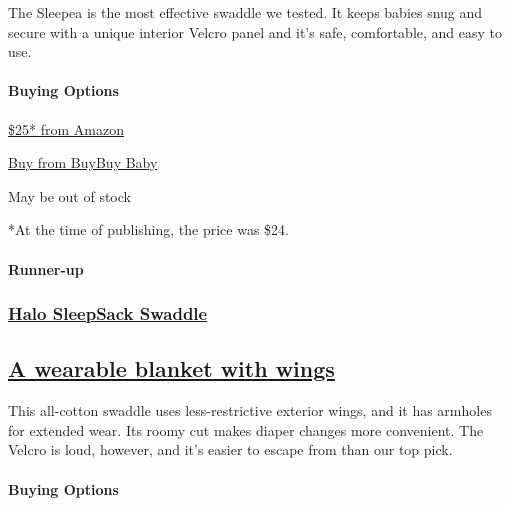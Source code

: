 The Sleepea is the most effective swaddle we tested. It keeps babies
snug and secure with a unique interior Velcro panel and it's safe,
comfortable, and easy to use.

\hypertarget{buying-options-3}{%
\paragraph{Buying Options}\label{buying-options-3}}

\href{https://www.nytimes3xbfgragh.onion/wirecutter/out/link/30686/150977/4/86632?merchant=Amazon}{\$25*
from Amazon}

\href{https://shop-links.co/1706409514726689177}{Buy from BuyBuy Baby}

May be out of stock

*At the time of publishing, the price was \$24.

\hypertarget{runner-up-1}{%
\paragraph{Runner-up}\label{runner-up-1}}

\href{https://www.nytimes3xbfgragh.onion/wirecutter/out/link/30687/150978/4/86633?merchant=Amazon}{}

\hypertarget{halo-sleepsack-swaddle-1}{%
\subsubsection{\texorpdfstring{\href{https://www.nytimes3xbfgragh.onion/wirecutter/out/link/30687/150978/4/86633?merchant=Amazon}{Halo
SleepSack
Swaddle}}{Halo SleepSack Swaddle}}\label{halo-sleepsack-swaddle-1}}

\hypertarget{a-wearable-blanket-with-wings-1}{%
\subsection{\texorpdfstring{\href{https://www.nytimes3xbfgragh.onion/wirecutter/out/link/30687/150978/4/86633?merchant=Amazon}{A
wearable blanket with
wings}}{A wearable blanket with wings}}\label{a-wearable-blanket-with-wings-1}}

This all-cotton swaddle uses less-restrictive exterior wings, and it has
armholes for extended wear. Its roomy cut makes diaper changes more
convenient. The Velcro is loud, however, and it's easier to escape from
than our top pick.

\hypertarget{buying-options-4}{%
\paragraph{Buying Options}\label{buying-options-4}}

